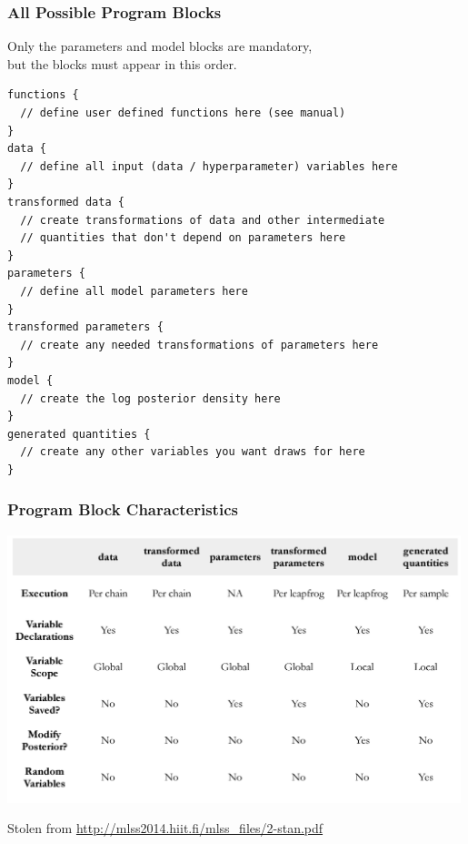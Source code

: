 \documentclass[xcolor=dvipsnames]{beamer}
\begin{document}
\begin{frame}[fragile]
\frametitle{All Possible Program Blocks}
Only the parameters and model blocks are mandatory,\\
but the blocks must appear in this order.
{\tiny
\begin{verbatim}
functions {
  // define user defined functions here (see manual)
}
data {
  // define all input (data / hyperparameter) variables here
}
transformed data {
  // create transformations of data and other intermediate
  // quantities that don't depend on parameters here
}
parameters {
  // define all model parameters here
}
transformed parameters {
  // create any needed transformations of parameters here
}
model {
  // create the log posterior density here
}
generated quantities {
  // create any other variables you want draws for here
}
\end{verbatim}}
\end{frame}

\begin{frame}[fragile]
\frametitle{Program Block Characteristics}
\begin{center}
\includegraphics[width = 0.99\textwidth]{blockchars.png}
\end{center}
Stolen from \url{http://mlss2014.hiit.fi/mlss_files/2-stan.pdf}
\end{frame}
\end{document}
